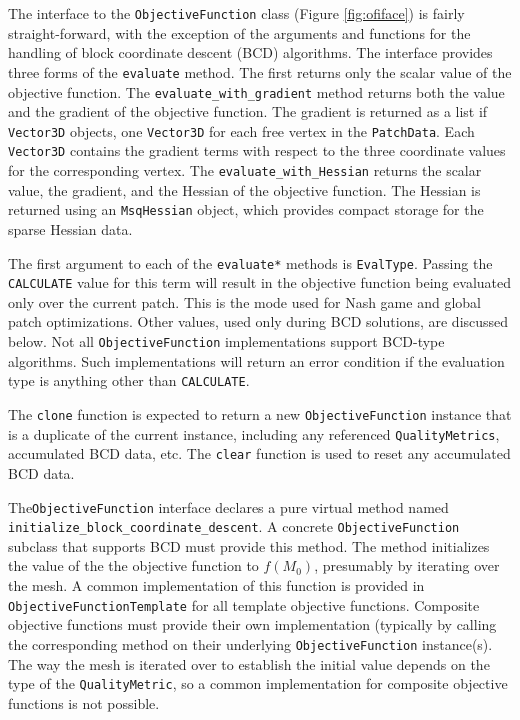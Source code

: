 \documentclass{article}
\begin{document}
The interface to the \texttt{ObjectiveFunction} class (Figure \ref{fig:ofiface}) is fairly straight-forward, with the exception of the arguments and functions for the handling of block coordinate descent (BCD) algorithms.  The interface provides three forms of the \texttt{evaluate} method.  The first returns only the scalar value of the objective function.  The \texttt{evaluate\_with\_gradient} method returns both the value and the gradient of the objective function.  The gradient is returned as a list if \texttt{Vector3D} objects, one \texttt{Vector3D} for each free vertex in the \texttt{PatchData}.   Each \texttt{Vector3D} contains the gradient terms with respect to the three coordinate values for the corresponding vertex.  The \texttt{evaluate\_with\_Hessian} returns the scalar value, the gradient, and the Hessian of the objective function.  The Hessian is returned using an \texttt{MsqHessian} object, which provides compact storage for the sparse Hessian data.

The first argument to each of the \texttt{evaluate*} methods is \texttt{EvalType}.  Passing the \texttt{CALCULATE} value for this term will result in the objective function being evaluated only over the current patch.  This is the mode used for Nash game and global patch optimizations.  Other values, used only during BCD solutions, are discussed below.  Not all \texttt{ObjectiveFunction} implementations support BCD-type algorithms.  Such implementations will return an error condition if the evaluation type is anything other than \texttt{CALCULATE}.

The \texttt{clone} function is expected to return a new \texttt{ObjectiveFunction} instance that is a duplicate of the current instance, including any referenced \texttt{QualityMetrics}, accumulated BCD data, etc.  The \texttt{clear} function is used to reset any accumulated BCD data.

The\texttt{ObjectiveFunction} interface declares a pure virtual method named \texttt{initialize\_block\_coordinate\_descent}.  A concrete \texttt{ObjectiveFunction} subclass that supports BCD must provide this method.  The method initializes the value of the the objective function to $f(M_0)$, presumably by iterating over the mesh.   A common implementation of this function is provided in \texttt{ObjectiveFunctionTemplate} for all template objective functions.  Composite objective functions must provide their own implementation (typically by calling the corresponding method on their underlying \texttt{ObjectiveFunction} instance(s).  The way the mesh is iterated over to establish the initial value depends on the type of the \texttt{QualityMetric}, so a common implementation for composite objective functions is not possible.
\end{document}
